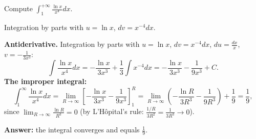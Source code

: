 
\begin{question}
Compute $\displaystyle\int_1^{+\infty}\frac{\ln x}{x^4}dx$.
\end{question}

\begin{hint}
Integration by parts with $u=\ln x$, $dv=x^{-4}dx$.
\end{hint}

\begin{solution}
\textbf{Antiderivative.} Integration by parts with $u=\ln x$, $dv=x^{-4}dx$, $du=\frac{dx}x$, $v=-\frac1{3x^3}$:
\[
\int\frac{\ln x}{x^4}dx=-\frac{\ln x}{3x^3}+\frac13\int x^{-4}dx=-\frac{\ln x}{3x^3}-\frac1{9x^3}+C.
\]
\textbf{The improper integral:}
\[
\int_1^{\infty}\frac{\ln x}{x^4}dx=\lim_{R\to\infty}\left[-\frac{\ln x}{3x^3}-\frac{1}{9x^3}\right]_1^R
=\lim_{R\to\infty}\left(-\frac{\ln R}{3R^3}-\frac1{9R^3}\right)+\frac19=\frac19,
\]
since $\lim_{R\to\infty}\frac{\ln R}{R^3}=0$ (by L'Hôpital's rule: $\frac{1/R}{3R^2}=\frac1{3R^3}\to0$).

\textbf{Answer:} the integral converges and equals $\frac19$.
\end{solution}
